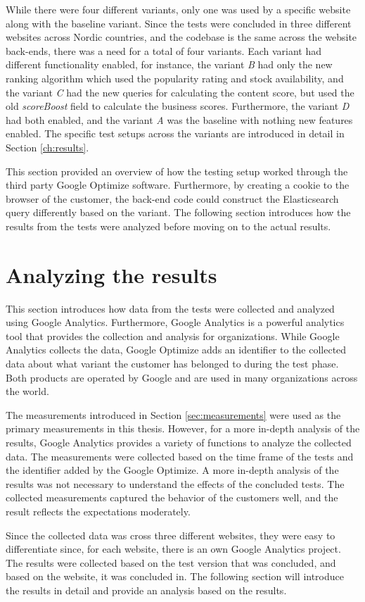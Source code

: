 While there were four different variants, only one was used by a specific website along with the baseline variant.
Since the tests were concluded in three different websites across Nordic countries, and the codebase is the same
across the website back-ends, there was a need for a total of four variants.
Each variant had different functionality enabled, for instance, the variant \emph{B} had only the new ranking algorithm 
which used the popularity rating and stock availability, and the variant \emph{C} had the new queries for calculating the
content score, but used the old \emph{scoreBoost} field to calculate the business scores.
Furthermore, the variant \emph{D} had both enabled, and the variant \emph{A} was the baseline with nothing new features
enabled.
The specific test setups across the variants are introduced in detail in Section \ref{ch:results}.


This section provided an overview of how the testing setup worked through the third party Google Optimize software.
Furthermore, by creating a cookie to the browser of the customer, the back-end code could construct the Elasticsearch
query differently based on the variant.
The following section introduces how the results from the tests were analyzed before moving on to the actual results.




\section{Analyzing the results}

This section introduces how data from the tests were collected and analyzed using Google Analytics.
Furthermore, Google Analytics is a powerful analytics tool that provides the collection and analysis for organizations.
While Google Analytics collects the data, Google Optimize adds an identifier to the collected data
about what variant the customer has belonged to during the test phase. 
Both products are operated by Google and are used in many organizations across the world.


The measurements introduced in Section \ref{sec:measurements} were used as the primary measurements in this thesis.
However, for a more in-depth analysis of the results, Google Analytics provides a variety of functions to analyze the collected
data.
The measurements were collected based on the time frame of the tests and the identifier added by the Google Optimize.
A more in-depth analysis of the results was not necessary to understand the effects of the concluded tests.
The collected measurements captured the behavior of the customers well, and the result reflects the
expectations moderately.



Since the collected data was cross three different websites, they were easy to differentiate since, for each website, there
is an own Google Analytics project.
The results were collected based on the test version that was concluded, and based on the website, it was concluded in.
The following section will introduce the results in detail and provide an analysis based on the results.